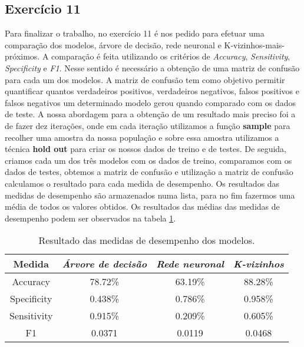 \subsection{Exercício 11}

Para finalizar o trabalho, no exercício 11 é nos pedido para efetuar uma comparação dos modelos, árvore de decisão, rede neuronal e K-vizinhos-mais-próximos. A comparação é feita utilizando os critérios de \textit{Accuracy}, \textit{Sensitivity}, \textit{Specificity} e \textit{F1}. Nesse sentido é necessário a obtenção de uma matriz de confusão para cada um dos modelos. A matriz de confusão tem como objetivo permitir quantificar quantos verdadeiros positivos, verdadeiros negativos, falsos positivos e falsos negativos um determinado modelo gerou quando comparado com os dados de teste.
A nossa abordagem para a obtenção de um resultado mais preciso foi a de fazer dez iterações, onde em cada iteração utilizamos a função \textbf{sample} para recolher uma amostra da nossa população e sobre essa amostra utilizamos a técnica \textbf{hold out} para criar os nossos dados de treino e de testes. De seguida, criamos cada um dos três modelos com os dados de treino, comparamos com os dados de testes, obtemos a matriz de confusão e utilização a matriz de confusão calculamos o resultado para cada medida de desempenho. Os resultados das medidas de desempenho são armazenados numa lista, para no fim fazermos uma média de todos os valores obtidos. Os resultados das médias das medidas de desempenho podem ser observados na tabela \ref{tab_11}.

\begin{table}[htbp]
\caption{Resultado das medidas de desempenho dos modelos.}
\begin{center}
\begin{tabular}{|c|c|c|c|}
\hline
\textbf{Medida} & \textbf{\textit{Árvore de decisão}}& \textbf{\textit{Rede neuronal}}& \textbf{\textit{K-vizinhos}}\\
\hline
Accuracy & 78.72\% & 63.19\% & 88.28\% \\
\hline
Specificity & 0.438\% & 0.786\% & 0.958\% \\
\hline
Sensitivity & 0.915\% & 0.209\% & 0.605\%\\
\hline
F1 & 0.0371 & 0.0119 & 0.0468\\
\hline
\end{tabular}
\label{tab_11}
\end{center}
\end{table}


